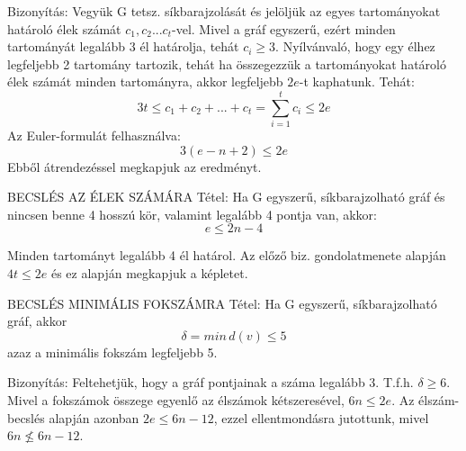 \documentclass[]{article}
\begin{document}
\begin{leftbar}
Bizonyítás: Vegyük G tetsz. síkbarajzolását és jelöljük az egyes tartományokat határoló élek számát $c_1, c_2...c_t$-vel. Mivel a gráf egyszerű, ezért minden tartományát legalább 3 él határolja, tehát $c_i \geq 3$. Nyílvánvaló, hogy egy élhez legfeljebb 2 tartomány tartozik, tehát ha összegezzük a tartományokat határoló élek számát minden tartományra, akkor legfeljebb $2e$-t kaphatunk. Tehát:
$$3t \leq c_1 + c_2 + ... + c_t = \sum_{i=1}^{t} c_i \leq 2e$$
Az Euler-formulát felhasználva:
$$3(e - n + 2) \leq 2e$$
Ebből átrendezéssel megkapjuk az eredményt.
\end{leftbar}
\begin{framed}
BECSLÉS AZ ÉLEK SZÁMÁRA Tétel: Ha G egyszerű, síkbarajzolható gráf és nincsen benne 4 hosszú kör, valamint legalább 4 pontja van, akkor:
$$e \leq 2n - 4$$
\end{framed}
\begin{leftbar}
Minden tartományt legalább 4 él határol. Az előző biz. gondolatmenete alapján $4t \leq 2e$ és ez alapján megkapjuk a képletet.
\end{leftbar}
\begin{framed}
BECSLÉS MINIMÁLIS FOKSZÁMRA Tétel: Ha G egyszerű, síkbarajzolható gráf, akkor $$\delta = min\, d(v) \leq 5$$ azaz a minimális fokszám legfeljebb 5.
\end{framed}
\begin{leftbar}
Bizonyítás: Feltehetjük, hogy a gráf pontjainak a száma legalább 3. T.f.h. $\delta \geq 6$. Mivel a fokszámok összege egyenlő az élszámok kétszeresével, $6n \leq 2e$. Az élszám-becslés alapján azonban $2e \leq 6n - 12$, ezzel ellentmondásra jutottunk, mivel $6n \not\leq 6n - 12$.
\end{leftbar}
\end{document}
